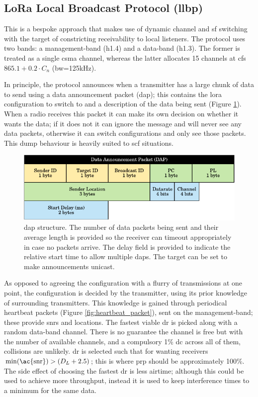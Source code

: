 \subsection{LoRa Local Broadcast Protocol (\ac{llbp})}
This is a bespoke approach that makes use of dynamic channel and \ac{sf} switching with the target of constricting receivability to local listeners. The protocol uses two bands: a management-band (h1.4) and a data-band (h1.3). The former is treated as a single \ac{csma} channel, whereas the latter allocates 15 channels at \ac{cf}s $865.1 + 0.2 \cdot C_n$ (\ac{bw}=125kHz).

In principle, the protocol announces when a transmitter has a large chunk of data to send using a data announcement packet (\ac{dap}); this contains the \ac{lora} configuration to switch to and a description of the data being sent (Figure \ref{fig:dap_packet}). When a radio receives this packet it can make its own decision on whether it wants the data; if it does not it can ignore the message and will never see any data packets, otherwise it can switch configurations and only see those packets. This dump behaviour is heavily suited to \ac{scf} situations.

\begin{figure}[H]
    \centering
   	\includegraphics{Figures/dap}
    \caption[Data Announcement Packet (\ac{dap})]{
 		 \ac{dap} structure. The number of data packets being sent and their average length is provided so the receiver can timeout appropriately in case no packets arrive. The delay field is provided to indicate the relative start time to allow multiple \ac{dap}s. The target can be set to make announcements unicast.
    }
    \label{fig:dap_packet}
\end{figure}

As opposed to agreeing the configuration with a flurry of transmissions at one point, the configuration is decided by the transmitter, using its prior knowledge of surrounding transmitters. This knowledge is gained through periodical heartbeat packets (Figure \ref{fig:heartbeat_packet}), sent on the management-band; these provide \ac{snr}s and locations. The fastest viable \ac{dr} is picked along with a random data-band channel. There is no guarantee the channel is free but with the number of available channels, and a compulsory 1\% \ac{dc} across all of them, collisions are unlikely. \ac{dr} is selected such that for wanting receivers $\min(\text{\ac{snr}}) > (D_L + 2.5)$; this is where \ac{prp} should be approximately 100\%. The side effect of choosing the fastest \ac{dr} is less airtime; although this could be used to achieve more throughput, instead it is used to keep interference times to a minimum for the same data.

